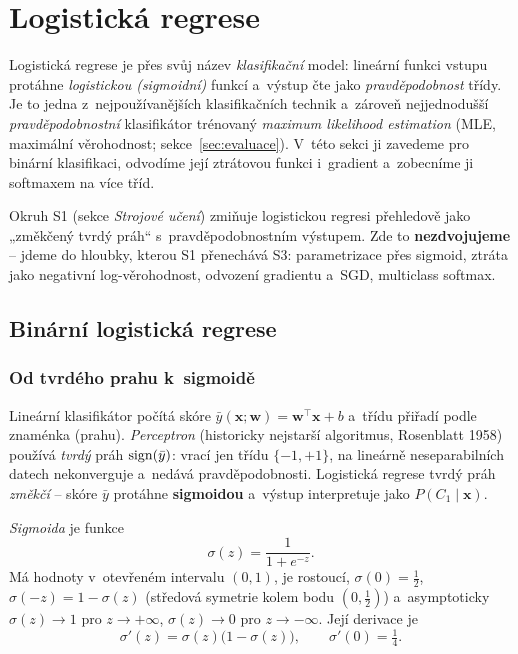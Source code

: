 \section{Logistická regrese}\label{sec:logisticka}

Logistická regrese je přes svůj název \emph{klasifikační} model: lineární funkci vstupu protáhne \emph{logistickou (sigmoidní)} funkcí a~výstup čte jako \emph{pravděpodobnost} třídy. Je to jedna z~nejpoužívanějších klasifikačních technik a~zároveň nejjednodušší \emph{pravděpodobnostní} klasifikátor trénovaný \emph{maximum likelihood estimation} (MLE, maximální věrohodnost; sekce~\ref{sec:evaluace}). V~této sekci ji zavedeme pro binární klasifikaci, odvodíme její ztrátovou funkci i~gradient a~zobecníme ji softmaxem na více tříd.

\begin{poznamka}[Vztah k~S1]
Okruh S1 (sekce \emph{Strojové učení}) zmiňuje logistickou regresi přehledově jako „změkčený tvrdý práh`` s~pravděpodobnostním výstupem. Zde to \textbf{nezdvojujeme} -- jdeme do hloubky, kterou S1 přenechává S3: parametrizace přes sigmoid, ztráta jako negativní log-věrohodnost, odvození gradientu a~SGD, multiclass softmax.
\end{poznamka}

\subsection{Binární logistická regrese}

\subsubsection*{Od tvrdého prahu k~sigmoidě}

Lineární klasifikátor počítá skóre $\bar y(\mathbf{x};\mathbf{w})=\mathbf{w}^{\!\top}\mathbf{x}+b$ a~třídu přiřadí podle znaménka (prahu). \emph{Perceptron} (historicky nejstarší algoritmus, Rosenblatt 1958) používá \emph{tvrdý} práh $\operatorname{sign}(\bar y)$: vrací jen třídu $\{-1,+1\}$, na lineárně neseparabilních datech nekonverguje a~nedává pravděpodobnosti. Logistická regrese tvrdý práh \emph{změkčí} -- skóre $\bar y$ protáhne \textbf{sigmoidou} a~výstup interpretuje jako $P(C_1\mid\mathbf{x})$.

\begin{definice}
\emph{Sigmoida} je funkce
\[ \sigma(z)=\frac{1}{1+e^{-z}}. \]
Má hodnoty v~otevřeném intervalu $(0,1)$, je rostoucí, $\sigma(0)=\tfrac12$, $\sigma(-z)=1-\sigma(z)$ (středová symetrie kolem bodu $(0,\tfrac12)$) a~asymptoticky $\sigma(z)\to 1$ pro $z\to+\infty$, $\sigma(z)\to 0$ pro $z\to-\infty$. Její derivace je
\[ \sigma'(z)=\sigma(z)\big(1-\sigma(z)\big),\qquad \sigma'(0)=\tfrac14. \]
\end{definice}

